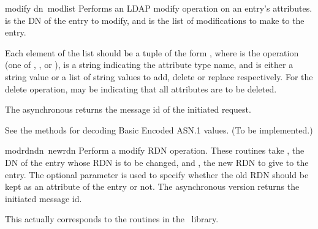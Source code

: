 
\begin{funcdesc}{modify}{ dn\, modlist }
Performs an LDAP modify operation on an entry's attributes. 
 is the DN of the entry to modify,
and  is the list of modifications to make to the entry.

Each element of the list  should be a tuple of the form 
,
where  is the operation (one of , ,
or ),
 is a string indicating the attribute type name, and 
 is either a string value or a list of string values to add, 
delete or replace respectively.  For the delete operation, 
may be  indicating that all attributes are to be deleted.

The asynchronous  returns the message id of the 
initiated request.

See the  methods for decoding Basic Encoded ASN.1 values.
(To be implemented.)
\end{funcdesc}


\begin{funcdesc}{modrdn}{dn\, newrdn }
Perform a modify RDN operation. These routines take , the DN
of the entry whose RDN is to be changed, and , the new RDN to
give to the entry. The optional parameter  is used to specify
whether the old RDN should be kept as an attribute of the entry or not.
The asynchronous version returns the initiated message id.

This actually corresponds to the  routines in the \C\ library.
\end{funcdesc}


